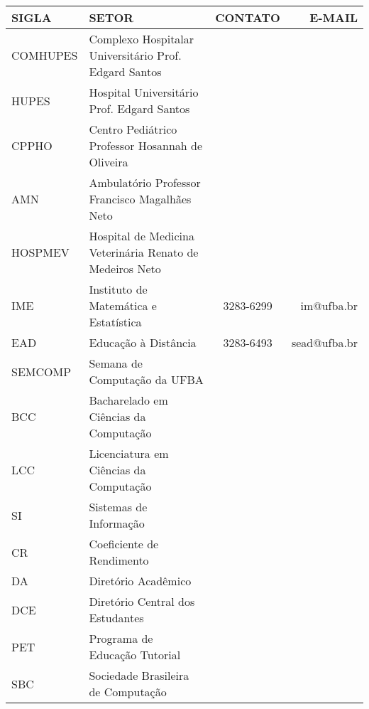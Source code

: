 \begin{table}[h]
\centering
\begin{tabular}{l K{6cm} c r}
\toprule
 SIGLA & SETOR & CONTATO & E-MAIL\\
  \midrule
  COMHUPES & Complexo Hospitalar Universitário Prof. Edgard Santos & & \\
  \midrule
  HUPES & Hospital Universitário Prof. Edgard Santos & & \\
  \midrule
  CPPHO & Centro Pediátrico Professor Hosannah de Oliveira & & \\
  \midrule
  AMN & Ambulatório Professor Francisco Magalhães Neto & & \\
  \midrule
  HOSPMEV & Hospital de Medicina Veterinária Renato de Medeiros Neto & & \\
  \midrule
  IME & Instituto de Matemática e Estatística & 3283-6299 & im@ufba.br \\
  \midrule
  EAD & Educação à Distância & 3283-6493 & sead@ufba.br \\
  \midrule
  SEMCOMP & Semana de Computação da UFBA & & \\
 \midrule
 BCC & Bacharelado em Ciências da Computação \\
 \midrule
 LCC & Licenciatura em Ciências da Computação \\
 \midrule
 SI & Sistemas de Informação \\
 \midrule
 CR & Coeficiente de Rendimento \\
 \midrule
 DA & Diretório Acadêmico \\
 \midrule
 DCE & Diretório Central dos Estudantes \\
 \midrule
 PET & Programa de Educação Tutorial \\
 \midrule
  SBC & Sociedade Brasileira de Computação & & \\
  \bottomrule
\end{tabular}
\end{table}